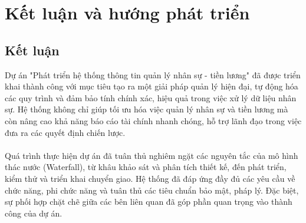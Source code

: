 \chapter*{Kết luận và hướng phát triển}
\label{Appendix1}

\section*{Kết luận}
Dự án "Phát triển hệ thống thông tin quản lý nhân sự - tiền lương" đã được triển khai thành công với mục tiêu tạo ra một giải pháp quản lý hiện đại, tự động hóa các quy trình và đảm bảo tính chính xác, hiệu quả trong việc xử lý dữ liệu nhân sự. Hệ thống không chỉ giúp tối ưu hóa việc quản lý nhân sự và tiền lương mà còn nâng cao khả năng báo cáo tài chính nhanh chóng, hỗ trợ lãnh đạo trong việc đưa ra các quyết định chiến lược.
\\ \\Quá trình thực hiện dự án đã tuân thủ nghiêm ngặt các nguyên tắc của mô hình thác nước (Waterfall), từ khâu khảo sát và phân tích thiết kế, đến phát triển, kiểm thử và triển khai chuyển giao. Hệ thống đã đáp ứng đầy đủ các yêu cầu về chức năng, phi chức năng và tuân thủ các tiêu chuẩn bảo mật, pháp lý. Đặc biệt, sự phối hợp chặt chẽ giữa các bên liên quan đã góp phần quan trọng vào thành công của dự án.

